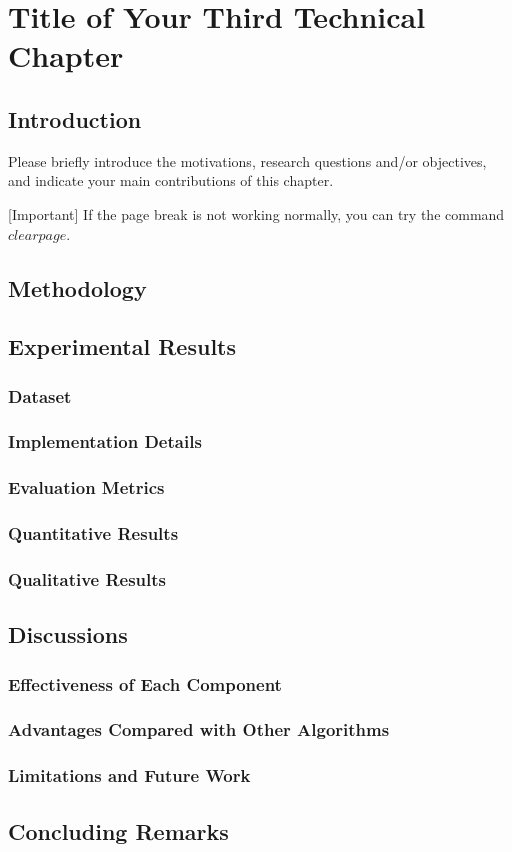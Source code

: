 \chapter{Title of Your Third Technical Chapter}
\label{chap:chapter_5}

\section{Introduction}


Please briefly introduce the motivations, research questions and/or objectives, and indicate your main contributions of this chapter.

[Important] If the page break is not working normally, you can try the command $clearpage$.

\clearpage

\section{Methodology}

\section{Experimental Results}

\subsection{Dataset}
\subsection{Implementation Details}
\subsection{Evaluation Metrics}
\subsection{Quantitative Results}
\subsection{Qualitative Results}


\section{Discussions}
\subsection{Effectiveness of Each Component}
\subsection{Advantages Compared with Other Algorithms}

\subsection{Limitations and Future Work}

\section{Concluding Remarks}

